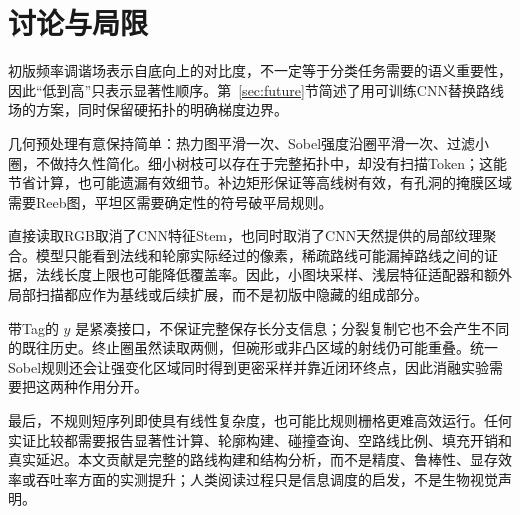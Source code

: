 \section{讨论与局限}
\label{sec:discussion}

初版频率调谐场表示自底向上的对比度，不一定等于分类任务需要的语义重要性，因此“低到高”只表示显著性顺序。第~\ref{sec:future}节简述了用可训练CNN替换路线场的方案，同时保留硬拓扑的明确梯度边界。

几何预处理有意保持简单：热力图平滑一次、Sobel强度沿圈平滑一次、过滤小圈，不做持久性简化。细小树枝可以存在于完整拓扑中，却没有扫描Token；这能节省计算，也可能遗漏有效细节。补边矩形保证等高线树有效，有孔洞的掩膜区域需要Reeb图，平坦区需要确定性的符号破平局规则。

直接读取RGB取消了CNN特征Stem，也同时取消了CNN天然提供的局部纹理聚合。模型只能看到法线和轮廓实际经过的像素，稀疏路线可能漏掉路线之间的证据，法线长度上限也可能降低覆盖率。因此，小图块采样、浅层特征适配器和额外局部扫描都应作为基线或后续扩展，而不是初版中隐藏的组成部分。

带Tag的 $y$ 是紧凑接口，不保证完整保存长分支信息；分裂复制它也不会产生不同的既往历史。终止圈虽然读取两侧，但碗形或非凸区域的射线仍可能重叠。统一Sobel规则还会让强变化区域同时得到更密采样并靠近闭环终点，因此消融实验需要把这两种作用分开。

最后，不规则短序列即使具有线性复杂度，也可能比规则栅格更难高效运行。任何实证比较都需要报告显著性计算、轮廓构建、碰撞查询、空路线比例、填充开销和真实延迟。本文贡献是完整的路线构建和结构分析，而不是精度、鲁棒性、显存效率或吞吐率方面的实测提升；人类阅读过程只是信息调度的启发，不是生物视觉声明。
